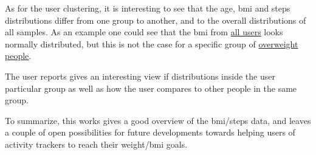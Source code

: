 \documentclass[11pt]{iopart}
\begin{document}
As for the user clustering, it is interesting to see that the age, bmi and steps distributions differ from one group to another, and to the overall distributions of all samples. 
As an example one could see that the bmi from 
 \href{http://htmlpreview.github.io/?https://github.com/renatalucia/activity-tracker/blob/master/data_exploration/bmi_steps.html}{all users} looks normally distributed, but this is not the case for a specific group of \href{https://github.com/renatalucia/activity-tracker/blob/master/clustering/report_2.pdf}{overweight people}. 

The user reports gives an interesting view if distributions inside the user particular group as well as how the user compares to other people in the same group.

To summarize, this works gives a good overview of the bmi/steps data, and leaves a couple of open possibilities for future developments towards helping users of activity trackers to reach their weight/bmi goals.
\end{document}
